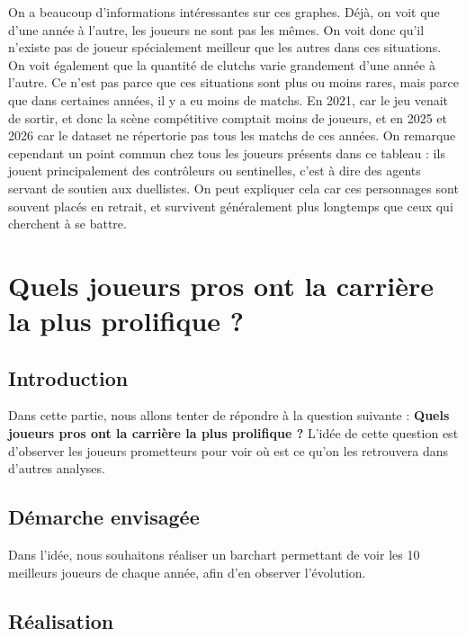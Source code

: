 \documentclass[
]{article}
\begin{document}
On a beaucoup d'informations intéressantes sur ces graphes. Déjà, on
voit que d'une année à l'autre, les joueurs ne sont pas les mêmes. On
voit donc qu'il n'existe pas de joueur spécialement meilleur que les
autres dans ces situations. On voit également que la quantité de clutchs
varie grandement d'une année à l'autre. Ce n'est pas parce que ces
situations sont plus ou moins rares, mais parce que dans certaines
années, il y a eu moins de matchs. En 2021, car le jeu venait de sortir,
et donc la scène compétitive comptait moins de joueurs, et en 2025 et
2026 car le dataset ne répertorie pas tous les matchs de ces années. On
remarque cependant un point commun chez tous les joueurs présents dans
ce tableau : ils jouent principalement des contrôleurs ou sentinelles,
c'est à dire des agents servant de soutien aux duellistes. On peut
expliquer cela car ces personnages sont souvent placés en retrait, et
survivent généralement plus longtemps que ceux qui cherchent à se
battre.

\section{Quels joueurs pros ont la carrière la plus prolifique
?}\label{quels-joueurs-pros-ont-la-carriuxe8re-la-plus-prolifique}

\subsection{Introduction}\label{introduction}

Dans cette partie, nous allons tenter de répondre à la question suivante
: \textbf{Quels joueurs pros ont la carrière la plus prolifique ?}
L'idée de cette question est d'observer les joueurs prometteurs pour
voir où est ce qu'on les retrouvera dans d'autres analyses.

\subsection{Démarche envisagée}\label{duxe9marche-envisaguxe9e}

Dans l'idée, nous souhaitons réaliser un barchart permettant de voir les
10 meilleurs joueurs de chaque année, afin d'en observer l'évolution.

\subsection{Réalisation}\label{ruxe9alisation}
\end{document}
